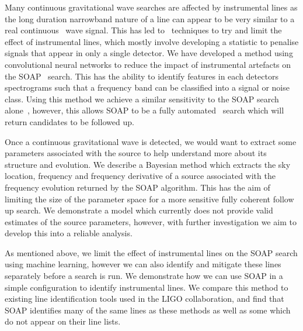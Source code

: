 Many continuous gravitational wave searches are affected by instrumental lines
as the long duration narrowband nature of a line can appear to be very similar
to a real continuous~ wave signal.  This has led
to~ techniques to try and limit the effect of
instrumental lines, which mostly involve developing a statistic to penalise
signals that appear in only a single detector.  We have developed a method
using convolutional neural networks to reduce the impact of instrumental
artefacts on the SOAP~ search.  This has the
ability to identify features in each detectors spectrograms such that a
frequency band can be classified into a signal or noise class.  Using this
method we achieve a similar sensitivity to the SOAP search alone~, however, this allows SOAP to be a fully
automated~ search which will return
candidates to be followed up.~


Once a continuous gravitational wave is detected, we would want to extract some
parameters associated with the source to help understand more about its
structure and evolution.  We describe a Bayesian method which extracts the sky
location, frequency and frequency derivative of a source associated with the
frequency evolution returned by the SOAP algorithm.  This has the aim of
limiting the size of the parameter space for a more sensitive fully coherent
follow up search.  We demonstrate a model which currently does not provide
valid estimates of the source parameters, however, with further investigation
we aim to develop this into a reliable analysis.~

As mentioned above, we limit the effect of instrumental lines on the SOAP
search using machine learning, however we can also identify and mitigate these
lines separately before a search is run.  We demonstrate how we can use SOAP in
a simple configuration to identify instrumental lines.  We compare this method
to existing line identification tools used in the \gls{LIGO} collaboration, and
find that SOAP identifies many of the same lines as these methods as well as
some which do not appear on their line lists.~







